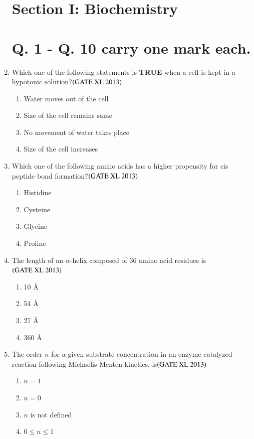 \documentclass[journal]{IEEEtran}
\begin{document}
\begin{enumerate}
\clearpage
\section*{Section I: Biochemistry}
\section*{Q. 1 - Q. 10 carry one mark each.}
\item Which one of the following statements is \textbf{TRUE} when a cell is kept in a hypotonic solution?\hfill $\left(\text{GATE XL 2013}\right)$
\begin{enumerate}
    \item Water moves out of the cell
    \item Size of the cell remains same
    \item No movement of water takes place
    \item Size of the cell increases
\end{enumerate}

\item Which one of the following amino acids has a higher propensity for cis peptide bond formation?\hfill $\left(\text{GATE XL 2013}\right)$
\begin{enumerate}
    \item Histidine
    \item Cysteine
    \item Glycine
    \item Proline
\end{enumerate}

\item The length of an $\alpha$-helix composed of 36 amino acid residues is\hfill $\left(\text{GATE XL 2013}\right)$
\begin{enumerate}
    \item 10 \AA
    \item 54 \AA
    \item 27 \AA
    \item 360 \AA
\end{enumerate}

\item The order $n$ for a given substrate concentration in an enzyme catalyzed reaction following Michaelis-Menten kinetics, is\hfill $\left(\text{GATE XL 2013}\right)$
\begin{enumerate}
    \item $n = 1$
    \item $n = 0$
    \item $n$ is not defined
    \item $0 \leq n \leq 1$
\end{enumerate}


\end{enumerate}
\end{document}
